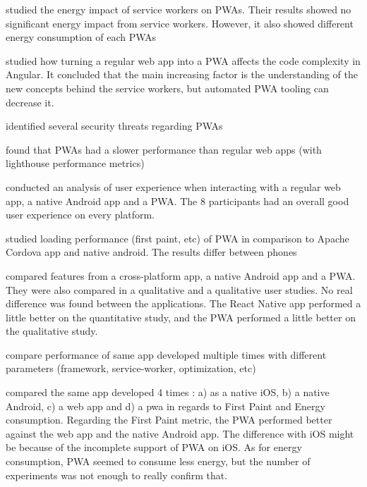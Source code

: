     \cite{SW_and_energy} studied the energy impact of service workers on PWAs. Their results showed no significant energy impact from service workers. However, it also showed different energy consumption of each PWAs
    
    \cite{JohannsenFabian2018PWAa} studied how turning a regular web app into a PWA affects the code complexity in Angular. It concluded that the main increasing factor is the understanding of the new concepts behind the service workers, but automated PWA tooling can decrease it.
    
    \cite{Pride_Prejudice} identified several security threats regarding PWAs
    
    \cite{bac_pwa_comparison} found that PWAs had a slower performance than regular web apps (with lighthouse performance metrics)
    
    \cite{PWA_UX_comparison_study} conducted an analysis of user experience when interacting with a regular web app, a native Android app and a PWA. The 8 participants had an overall good user experience on every platform.
    
    \cite{bac_pwa_performance} studied loading performance (first paint, etc) of PWA in comparison to Apache Cordova app and native android. The results differ between phones %
    
    \cite{emulating_native_w_crossplatform} compared features from a cross-platform app, a native Android app and a PWA. They were also compared in a qualitative and a qualitative user studies. No real difference was found between the applications. The React Native app performed a little better on the quantitative study, and the PWA performed a little better on the qualitative study.
    
    \cite{PWADatabase} compare performance of same app developed multiple times with different parameters (framework, service-worker, optimization, etc)
    
    \cite{PWAapplicability} compared the same app developed 4 times : a) as a native iOS, b) a native Android, c) a web app and d) a pwa in regards to First Paint and Energy consumption. Regarding the First Paint metric, the PWA performed better against the web app and the native Android app. The difference with iOS might be because of the incomplete support of PWA on iOS. As for energy consumption, PWA seemed to consume less energy, but the number of experiments was not enough to really confirm that.
    
    \iffalse
